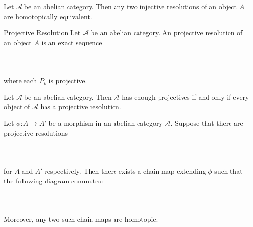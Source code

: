\documentclass[a4paper]{article}
\begin{document}
\begin{lmm}{}{} Let $\mathcal{A}$ be an abelian category. Then any two injective resolutions of an object $A$ are homotopically equivalent. 
\end{lmm}

\begin{defn}{Projective Resolution}{} Let $\mathcal{A}$ be an abelian category. An projective resolution of an object $A$ is an exact sequence \\~\\
\\~\\
where each $P_k$ is projective. 
\end{defn}

\begin{thm}{}{} Let $\mathcal{A}$ be an abelian category. Then $\mathcal{A}$ has enough projectives if and only if every object of $\mathcal{A}$ has a projective resolution. 
\end{thm}

\begin{prp}{}{} Let $\phi:A\to A'$ be a morphism in an abelian category $\mathcal{A}$. Suppose that there are projective resolutions \\~\\
\\~\\
for $A$ and $A'$ respectively. Then there exists a chain map extending $\phi$ such that the following diagram commutes: \\~\\
\\~\\
Moreover, any two such chain maps are homotopic. 
\end{prp}
\end{document}
